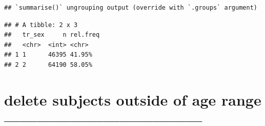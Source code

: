 \documentclass[
]{article}
\newenvironment{Shaded}{\begin{snugshade}}{\end{snugshade}}
\newcommand{\DataTypeTok}[1]{\textcolor[rgb]{0.13,0.29,0.53}{#1}}
\newcommand{\DecValTok}[1]{\textcolor[rgb]{0.00,0.00,0.81}{#1}}
\newcommand{\KeywordTok}[1]{\textcolor[rgb]{0.13,0.29,0.53}{\textbf{#1}}}
\newcommand{\NormalTok}[1]{#1}
\newcommand{\OperatorTok}[1]{\textcolor[rgb]{0.81,0.36,0.00}{\textbf{#1}}}
\newcommand{\StringTok}[1]{\textcolor[rgb]{0.31,0.60,0.02}{#1}}
\begin{document}
\begin{Shaded}
\end{Shaded}

\begin{verbatim}
## `summarise()` ungrouping output (override with `.groups` argument)
\end{verbatim}

\begin{verbatim}
## # A tibble: 2 x 3
##   tr_sex     n rel.freq
##   <chr>  <int> <chr>   
## 1 1      46395 41.95%  
## 2 2      64190 58.05%
\end{verbatim}

\hypertarget{delete-subjects-outside-of-age-range}{%
\section{delete subjects outside of age range
------------------------------------}\label{delete-subjects-outside-of-age-range}}

\begin{Shaded}
\end{Shaded}
\end{document}
